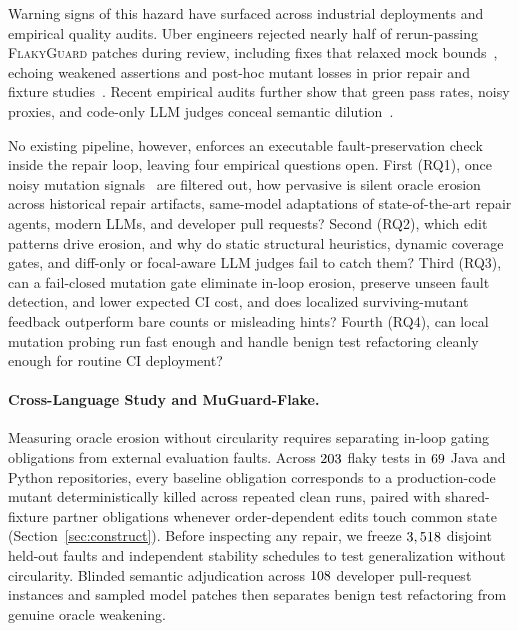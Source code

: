 Warning signs of this hazard have surfaced across industrial deployments and empirical quality audits. Uber engineers rejected nearly half of rerun-passing \textsc{FlakyGuard} patches during review, including fixes that relaxed mock bounds~\cite{li2025flakyguard}, echoing weakened assertions and post-hoc mutant losses in prior repair and fixture studies~\cite{fatima2024flakyfix,li2024testboost,ke2025niodebugger,rafi2026reproflake}. Recent empirical audits further show that green pass rates, noisy proxies, and code-only LLM judges conceal semantic dilution~\cite{leunig2026perl,bludau2026szz,chou2026aijudge}.

No existing pipeline, however, enforces an executable fault-preservation check inside the repair loop, leaving four empirical questions open. First (RQ1), once noisy mutation signals~\cite{parry2026flimsiness} are filtered out, how pervasive is silent oracle erosion across historical repair artifacts, same-model adaptations of state-of-the-art repair agents, modern LLMs, and developer pull requests? Second (RQ2), which edit patterns drive erosion, and why do static structural heuristics, dynamic coverage gates, and diff-only or focal-aware LLM judges fail to catch them? Third (RQ3), can a fail-closed mutation gate eliminate in-loop erosion, preserve unseen fault detection, and lower expected CI cost, and does localized surviving-mutant feedback outperform bare counts or misleading hints? Fourth (RQ4), can local mutation probing run fast enough and handle benign test refactoring cleanly enough for routine CI deployment?

\paragraph{Cross-Language Study and MuGuard-Flake.}
Measuring oracle erosion without circularity requires separating in-loop gating obligations from external evaluation faults. Across $203$ flaky tests in $69$ Java and Python repositories, every baseline obligation corresponds to a production-code mutant deterministically killed across repeated clean runs, paired with shared-fixture partner obligations whenever order-dependent edits touch common state (Section~\ref{sec:construct}). Before inspecting any repair, we freeze $3,518$ disjoint held-out faults and independent stability schedules to test generalization without circularity. Blinded semantic adjudication across $108$ developer pull-request instances and sampled model patches then separates benign test refactoring from genuine oracle weakening.

